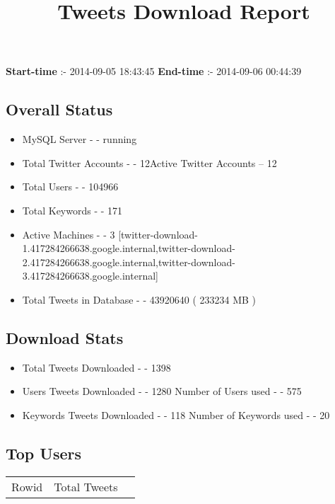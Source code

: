 \documentclass{article}\usepackage[T1]{fontenc}
\begin{document}
\title{\textbf{Tweets Download Report}}
               \date{}
                \maketitle
               \centerline{\textbf{Start-time} :- 2014-09-05 18:43:45 \hspace{40pt} \textbf{End-time} :- 2014-09-06 00:44:39}               \subsection*{Overall Status}                \begin{itemize}                \item MySQL Server - - running               \item Total Twitter Accounts - - 12\newline Active Twitter Accounts -- 12               \item Total Users - - 104966               \item Total Keywords - - 171               \item Active Machines - - 3 [twitter-download-1.417284266638.google.internal,twitter-download-2.417284266638.google.internal,twitter-download-3.417284266638.google.internal]               \item Total Tweets in Database - - 43920640 ( 233234 MB )               \end{itemize}               \subsection*{Download Stats}                \begin{itemize}                \item Total Tweets Downloaded - - 1398               \item Users Tweets Downloaded - - 1280 \newline Number of Users used - - 575               \item Keywords Tweets Downloaded - - 118 \newline Number of Keywords used - - 20              \end{itemize}              \subsection*{Top Users}\begin{tabular}{|c|c|c|}         \hline         Rowid & Total Tweets \\ 

\end{tabular}
\end{document}

